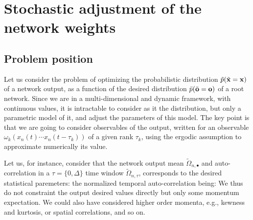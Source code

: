 \section{Stochastic adjustment of the network weights}\label{stochastic}

\subsection*{Problem position}

Let us consider the problem of optimizing the probabilistic distribution $\tilde{p}(\tilde{\bf x} = {\bf x})$ of a network output, as a function of the desired distribution $\bar{p}(\bar{\bf o} = {\bf o})$ of a root network. Since we are in a multi-dimensional and dynamic framework, with continuous values, it is  intractable to consider as it the distribution, but only a parametric model of it, and adjust the parameters of this model. The key point is that we are going to consider observables of the output, written 
for an observable  $\omega_{k}(x_n(t) \cdots x_n(t-\tau_k))$ of a given rank $\tau_k$, using the ergodic assumption to approximate numerically its value.

Let us, for instance, consider that the network output mean $\tilde{\Omega}_{n,\bullet}$ and auto-correlation in a $\tau = \{0, \Delta\}$ time window $\tilde{\Omega}_{n,\tau}$, corresponds to the desired statistical paremeters:
the normalized temporal auto-correlation being: 
We thus do not constraint the output desired values directly but only some momentum expectation.
We could also have considered higher order momenta, e.g., kewness and kurtosis, or spatial correlations, and so on.

